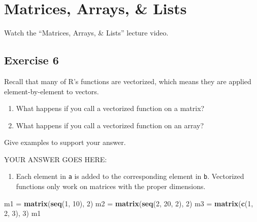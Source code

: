 \documentclass[
]{article}
\newenvironment{Shaded}{\begin{snugshade}}{\end{snugshade}}
\newcommand{\DecValTok}[1]{\textcolor[rgb]{0.00,0.00,0.81}{#1}}
\newcommand{\KeywordTok}[1]{\textcolor[rgb]{0.13,0.29,0.53}{\textbf{#1}}}
\newcommand{\NormalTok}[1]{#1}
\newcommand{\StringTok}[1]{\textcolor[rgb]{0.31,0.60,0.02}{#1}}
\providecommand{\tightlist}{%
  \setlength{\itemsep}{0pt}\setlength{\parskip}{0pt}}
\begin{document}
\hypertarget{matrices-arrays-lists}{%
\section{Matrices, Arrays, \& Lists}\label{matrices-arrays-lists}}

Watch the ``Matrices, Arrays, \& Lists'' lecture video.

\hypertarget{exercise-6}{%
\subsection{Exercise 6}\label{exercise-6}}

Recall that many of R's functions are vectorized, which means they are
applied element-by-element to vectors.

\begin{enumerate}
\def\labelenumi{\arabic{enumi}.}
\item
  What happens if you call a vectorized function on a matrix?
\item
  What happens if you call a vectorized function on an array?
\end{enumerate}

Give examples to support your answer.

YOUR ANSWER GOES HERE:

\begin{enumerate}
\def\labelenumi{\arabic{enumi}.}
\tightlist
\item
  Each element in \texttt{a} is added to the corresponding element in
  \texttt{b}. Vectorized functions only work on matrices with the proper
  dimensions.
\end{enumerate}

\begin{Shaded}
\begin{Highlighting}[]
\NormalTok{m1 =}\StringTok{ }\KeywordTok{matrix}\NormalTok{(}\KeywordTok{seq}\NormalTok{(}\DecValTok{1}\NormalTok{, }\DecValTok{10}\NormalTok{), }\DecValTok{2}\NormalTok{)}
\NormalTok{m2 =}\StringTok{ }\KeywordTok{matrix}\NormalTok{(}\KeywordTok{seq}\NormalTok{(}\DecValTok{2}\NormalTok{, }\DecValTok{20}\NormalTok{, }\DecValTok{2}\NormalTok{), }\DecValTok{2}\NormalTok{)}
\NormalTok{m3 =}\StringTok{ }\KeywordTok{matrix}\NormalTok{(}\KeywordTok{c}\NormalTok{(}\DecValTok{1}\NormalTok{, }\DecValTok{2}\NormalTok{, }\DecValTok{3}\NormalTok{), }\DecValTok{3}\NormalTok{)}
\NormalTok{m1}
\end{Highlighting}
\end{Shaded}
\end{document}

